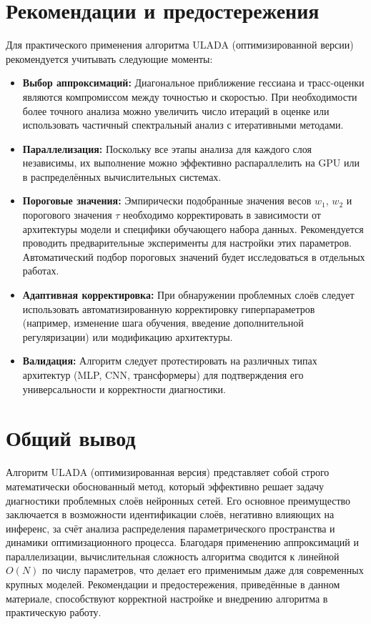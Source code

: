 \documentclass[a4paper,12pt]{article}
\begin{document}
\newpage

\section{Рекомендации и предостережения}

Для практического применения алгоритма ULADA (оптимизированной версии) рекомендуется учитывать следующие моменты:
\begin{itemize}
    \item \textbf{Выбор аппроксимаций:} Диагональное приближение гессиана и трасс-оценки являются компромиссом между точностью и скоростью. При необходимости более точного анализа можно увеличить число итераций в оценке или использовать частичный спектральный анализ с итеративными методами.
    \item \textbf{Параллелизация:} Поскольку все этапы анализа для каждого слоя независимы, их выполнение можно эффективно распараллелить на GPU или в распределённых вычислительных системах.
    \item \textbf{Пороговые значения:} Эмпирически подобранные значения весов \( w_1 \), \( w_2 \) и порогового значения \(\tau\) необходимо корректировать в зависимости от архитектуры модели и специфики обучающего набора данных. Рекомендуется проводить предварительные эксперименты для настройки этих параметров. Автоматический подбор пороговых значений будет исследоваться в отдельных работах.
    \item \textbf{Адаптивная корректировка:} При обнаружении проблемных слоёв следует использовать автоматизированную корректировку гиперпараметров (например, изменение шага обучения, введение дополнительной регуляризации) или модификацию архитектуры.
    \item \textbf{Валидация:} Алгоритм следует протестировать на различных типах архитектур (MLP, CNN, трансформеры) для подтверждения его универсальности и корректности диагностики.
\end{itemize}

\section*{Общий вывод}

Алгоритм ULADA (оптимизированная версия) представляет собой строго математически обоснованный метод, который эффективно решает задачу диагностики проблемных слоёв нейронных сетей. Его основное преимущество заключается в возможности идентификации слоёв, негативно влияющих на инференс, за счёт анализа распределения параметрического пространства и динамики оптимизационного процесса. Благодаря применению аппроксимаций и параллелизации, вычислительная сложность алгоритма сводится к линейной \( O(N) \) по числу параметров, что делает его применимым даже для современных крупных моделей. Рекомендации и предостережения, приведённые в данном материале, способствуют корректной настройке и внедрению алгоритма в практическую работу.
\end{document}
